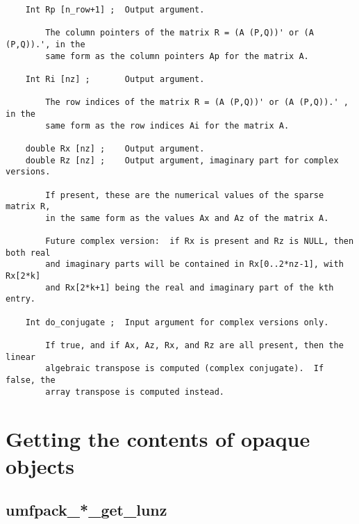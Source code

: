 {\begin{verbatim}
    Int Rp [n_row+1] ;  Output argument.

        The column pointers of the matrix R = (A (P,Q))' or (A (P,Q)).', in the
        same form as the column pointers Ap for the matrix A.

    Int Ri [nz] ;       Output argument.

        The row indices of the matrix R = (A (P,Q))' or (A (P,Q)).' , in the
        same form as the row indices Ai for the matrix A.

    double Rx [nz] ;    Output argument.
    double Rz [nz] ;    Output argument, imaginary part for complex versions.

        If present, these are the numerical values of the sparse matrix R,
        in the same form as the values Ax and Az of the matrix A.

        Future complex version:  if Rx is present and Rz is NULL, then both real
        and imaginary parts will be contained in Rx[0..2*nz-1], with Rx[2*k]
        and Rx[2*k+1] being the real and imaginary part of the kth entry.

    Int do_conjugate ;  Input argument for complex versions only.

        If true, and if Ax, Az, Rx, and Rz are all present, then the linear
        algebraic transpose is computed (complex conjugate).  If false, the
        array transpose is computed instead.
\end{verbatim}
}

\newpage
\section{Getting the contents of opaque objects}
\label{Get}

\subsection{umfpack\_*\_get\_lunz}

